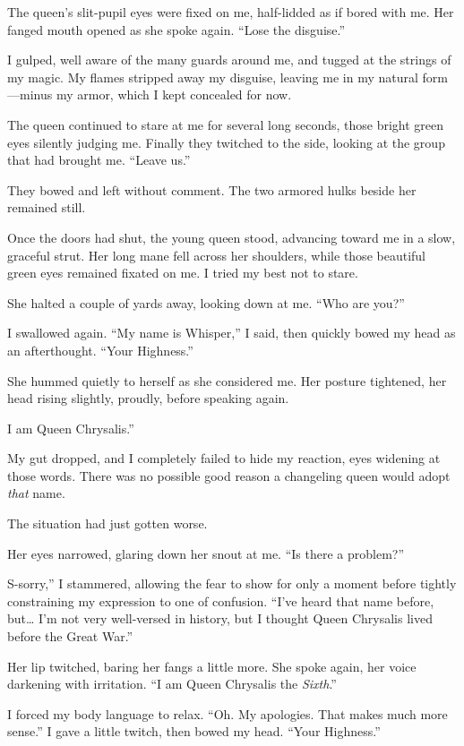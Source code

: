 The queen’s slit-pupil eyes were fixed on me, half-lidded as if bored with me. Her fanged mouth opened as she spoke again. “Lose the disguise.”

I gulped, well aware of the many guards around me, and tugged at the strings of my magic. My flames stripped away my disguise, leaving me in my natural form—minus my armor, which I kept concealed for now.

The queen continued to stare at me for several long seconds, those bright green eyes silently judging me. Finally they twitched to the side, looking at the group that had brought me. “Leave us.”

They bowed and left without comment. The two armored hulks beside her remained still.

Once the doors had shut, the young queen stood, advancing toward me in a slow, graceful strut. Her long mane fell across her shoulders, while those beautiful green eyes remained fixated on me. I tried my best not to stare.

She halted a couple of yards away, looking down at me. “Who are you?”

I swallowed again. “My name is Whisper,” I said, then quickly bowed my head as an afterthought. “Your Highness.”

She hummed quietly to herself as she considered me. Her posture tightened, her head rising slightly, proudly, before speaking again.

\leavevmode{}I am Queen Chrysalis.”

My gut dropped, and I completely failed to hide my reaction, eyes widening at those words. There was no possible good reason a changeling queen would adopt \textit{that} name.

The situation had just gotten worse.

Her eyes narrowed, glaring down her snout at me. “Is there a problem?”

\leavevmode{}S-sorry,” I stammered, allowing the fear to show for only a moment before tightly constraining my expression to one of confusion. “I’ve heard that name before, but… I’m not very well-versed in history, but I thought Queen Chrysalis lived before the Great War.”

Her lip twitched, baring her fangs a little more. She spoke again, her voice darkening with irritation. “I am Queen Chrysalis the \textit{Sixth}.”

I forced my body language to relax. “Oh. My apologies. That makes much more sense.” I gave a little twitch, then bowed my head. “Your Highness.”

